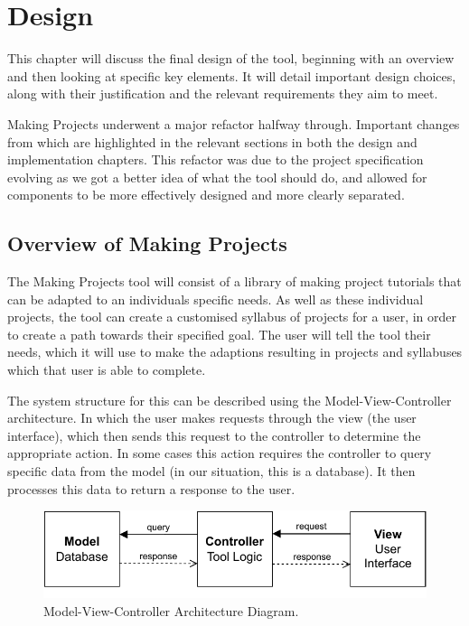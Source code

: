 \documentclass{l4proj}
\begin{document}
\chapter{Design}
\label{design}
This chapter will discuss the final design of the tool, beginning with an overview and then looking at specific key elements. It will detail important design choices, along with their justification and the relevant requirements they aim to meet. 

Making Projects underwent a major refactor halfway through. Important changes from which are highlighted in the relevant sections in both the design and implementation chapters. This refactor was due to the project specification evolving as we got a better idea of what the tool should do, and allowed for components to be more effectively designed and more clearly separated. 

\section{Overview of Making Projects}
The Making Projects tool will consist of a library of making project tutorials that can be adapted to an individuals specific needs. As well as these individual projects, the tool can create a customised syllabus of projects for a user, in order to create a path towards their specified goal. The user will tell the tool their needs, which it will use to make the adaptions resulting in projects and syllabuses which that user is able to complete.  

The system structure for this can be described using the Model-View-Controller architecture. In which the user makes requests through the view (the user interface), which then sends this request to the controller to determine the appropriate action. In some cases this action requires the controller to query specific data from the model (in our situation, this is a database). It then processes this data to return a response to the user. 
\begin{figure}[htb]
    \centering
    \includegraphics[width=0.75\linewidth]{images/MVC.pdf}    

    \caption{Model-View-Controller Architecture Diagram.
    }
    \label{fig:MCV_fig} 
\end{figure}
\end{document}

